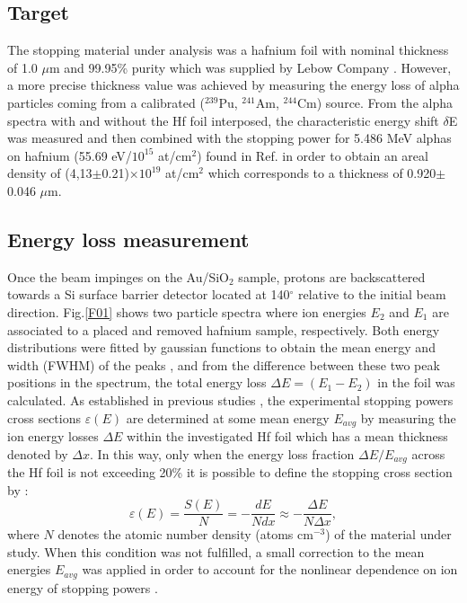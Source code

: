 \documentclass[aps,prb,reprint,groupedaddress]{revtex4-1}
\begin{document}
\subsection{Target}
The stopping material under analysis was a hafnium foil with nominal thickness of 1.0 $\mu$m and 99.95\% purity which was supplied by Lebow Company \cite{Lebow}. However, a more precise thickness value was achieved by measuring the energy loss of alpha particles coming from a calibrated ($^{239}$Pu, $^{241}$Am, $^{244}$Cm) source. From the alpha spectra with and without the Hf foil interposed, the characteristic energy shift $\delta$E was measured and then combined with the stopping power for 5.486 MeV alphas on hafnium (55.69 eV/$10^{15}$ at/cm$^2$) found in Ref.\cite{Ziegler01} in order to obtain an areal density of (4,13$\pm$0.21)$\times 10^{19}$ at/cm$^2$ which corresponds to a thickness of 0.920$\pm$0.046 $\mu$m.
\subsection{Energy loss measurement}
Once the beam impinges on the Au/SiO$_2$ sample, protons are backscattered towards a Si surface barrier detector located at 140$^{\circ}$ relative to the initial beam direction. Fig.\ref{F01} shows two particle spectra where ion energies $E_2$ and $E_1$ are associated to a placed and removed hafnium sample, respectively. Both energy distributions were fitted by gaussian functions to obtain the mean energy and width (FWHM) of the peaks \cite{Sun01}, and from the difference between these two peak positions in the spectrum, the total energy loss $\Delta E = (E_1 - E_2)$ in the foil was calculated. As established in previous studies \cite{Miranda01, Damache02}, the experimental stopping powers cross sections $\varepsilon (E) $ are determined at some mean energy $E_{avg}$ by measuring the ion energy losses $\Delta E$ within the investigated Hf foil which has a mean thickness denoted by $\Delta x$. In this way, only when the energy loss fraction $\Delta E/E_{avg}$ across the Hf foil is not exceeding 20\%
it is possible to define the stopping cross section by \cite{Raisanen01,Schulz01}:
\begin{equation}\label{eq:stcross}
 \varepsilon (E) = \frac{S(E)}{N} = -\frac{dE}{N dx} \approx -\frac{\Delta E}{N \Delta x},
\end{equation}
where $N$ denotes the atomic number density (atoms cm$^{-3}$) of the material under study. When this condition was not fulfilled, a small correction to the mean energies $E_{avg}$ was applied in order to account for the nonlinear dependence on ion energy of stopping powers \cite{Chilton,Rajatora}.
\end{document}
